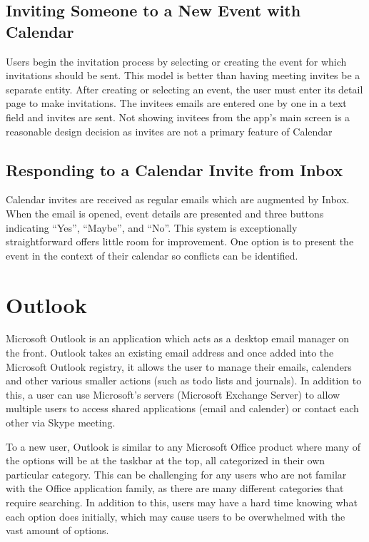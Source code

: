 \documentclass{sigchi}
\begin{document}
\begin{enumerate}
\subsection{Inviting Someone to a New Event with Calendar}
Users begin the invitation process by selecting or creating the event for which invitations should be sent.
This model is better than having meeting invites be a separate entity.
After creating or selecting an event, the user must enter its detail page to make invitations.
The invitees emails are entered one by one in a text field and invites are sent.
Not showing invitees from the app's main screen is a reasonable design decision as invites are not a primary feature of Calendar

\subsection{Responding to a Calendar Invite from Inbox}
Calendar invites are received as regular emails which are augmented by Inbox.
When the email is opened, event details are presented and three buttons indicating ``Yes'', ``Maybe'', and ``No''.
This system is exceptionally straightforward offers little room for improvement.
One option is to present the event in the context of their calendar so conflicts can be identified.

\section{Outlook}

Microsoft Outlook is an application which acts as a desktop email manager on the front. 
Outlook takes an existing email address and once added into the Microsoft Outlook registry, it allows the user to manage their emails, calenders and other various smaller actions (such as todo lists and journals). 
In addition to this, a user can use Microsoft's servers (Microsoft Exchange Server) to allow multiple users to access shared applications (email and calender) or contact each other via Skype meeting.

To a new user, Outlook is similar to any Microsoft Office product where many of the options will be at the taskbar at the top, all categorized in their own particular category. 
This can be challenging for any users who are not familar with the Office application family, as there are many different categories that require searching. 
In addition to this, users may have a hard time knowing what each option does initially, which may cause users to be overwhelmed with the vast amount of options. 


\end{enumerate}
\end{document}
